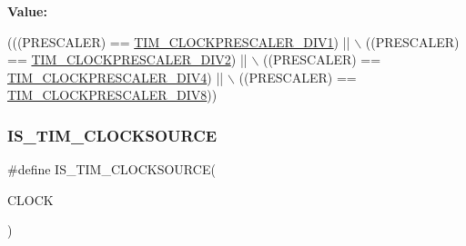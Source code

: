 {\bfseries Value\+:}
\begin{DoxyCode}
(((PRESCALER) == \mbox{\hyperlink{group___t_i_m___clock___prescaler_ga3462b444a059f001c6df33f55c756313}{TIM\_CLOCKPRESCALER\_DIV1}}) || \(\backslash\)
                                          ((PRESCALER) == 
      \mbox{\hyperlink{group___t_i_m___clock___prescaler_gac6457751c882644727982fda1fd029a5}{TIM\_CLOCKPRESCALER\_DIV2}}) || \(\backslash\)
                                          ((PRESCALER) == 
      \mbox{\hyperlink{group___t_i_m___clock___prescaler_ga11ce3686a0ee934384d0e4651823883d}{TIM\_CLOCKPRESCALER\_DIV4}}) || \(\backslash\)
                                          ((PRESCALER) == 
      \mbox{\hyperlink{group___t_i_m___clock___prescaler_ga86f147be5654631b21aa391a001401d5}{TIM\_CLOCKPRESCALER\_DIV8}}))
\end{DoxyCode}
\mbox{\label{group___t_i_m___i_s___t_i_m___definitions_gafaf10dedf3c9c286591f3a76bc806cdb}} 
\subsubsection{\texorpdfstring{I\+S\+\_\+\+T\+I\+M\+\_\+\+C\+L\+O\+C\+K\+S\+O\+U\+R\+CE}{IS\_TIM\_CLOCKSOURCE}}
{\footnotesize\ttfamily \#define I\+S\+\_\+\+T\+I\+M\+\_\+\+C\+L\+O\+C\+K\+S\+O\+U\+R\+CE(\begin{DoxyParamCaption}\item[{}]{C\+L\+O\+CK }\end{DoxyParamCaption})}

